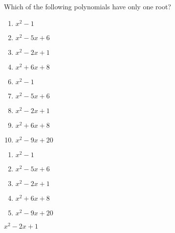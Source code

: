 

 Which of the following polynomials have only one root?


\ifsat
	\begin{enumerate}[label=\Alph*)]
		\item  $x^{2}-1$
		\item  $x^{2}-5x+6$
		\item  $x^{2}-2x+1$%
		\item  $x^{2}+6x+8$
	\end{enumerate}
\else
\fi

\ifacteven
	\begin{enumerate}[label=\textbf{\Alph*.},itemsep=\fill,align=left]
		\setcounter{enumii}{5}
		\item  $x^{2}-1$
		\item  $x^{2}-5x+6$
		\item  $x^{2}-2x+1$%
		\addtocounter{enumii}{1}
		\item  $x^{2}+6x+8$
		\item  $x^{2}-9x+20$
	\end{enumerate}
\else
\fi

\ifactodd
	\begin{enumerate}[label=\textbf{\Alph*.},itemsep=\fill,align=left]
		\item  $x^{2}-1$
		\item  $x^{2}-5x+6$
		\item  $x^{2}-2x+1$%
		\item  $x^{2}+6x+8$
		\item  $x^{2}-9x+20$
	\end{enumerate}
\else
\fi

\ifgridin
  $x^{2}-2x+1$%
		
\else
\fi

